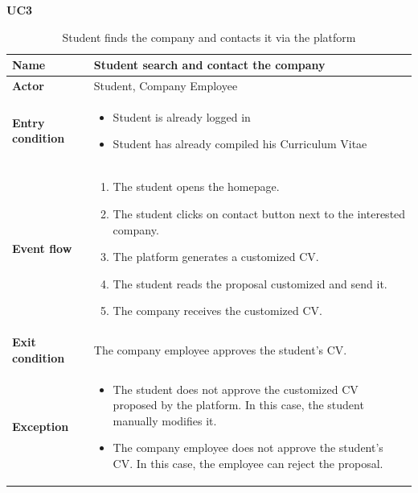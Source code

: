    \textbf{UC3}
    \nopagebreak
    \begin{table}[H]
    \centering
    \begin{tabular}{|l|p{11.9cm}|}
        \hline
        \textbf{Name}            & Student search and contact the company \\\hline
        \textbf{Actor}           & Student, Company Employee         \\\hline
        \textbf{Entry condition} &
        \begin{itemize}
              \item Student is already logged in
              \item Student has already compiled his Curriculum Vitae
        \end{itemize}                                        \\\hline
        \textbf{Event flow}      &
        \begin{enumerate}[label=\arabic*.]
              \item The student opens the homepage.
              \item The student clicks on contact button next to the interested company.
              \item The platform generates a customized CV.
              \item The student reads the proposal customized and send it.
              \item The company receives the customized CV.
        \end{enumerate}            \\\hline
        \textbf{Exit condition}  & The company employee approves the student's CV.\\\hline
        \textbf{Exception}       &  
        \begin{itemize}
              \item The student does not approve the customized CV proposed by the platform. In this case, the student manually modifies it.
              \item The company employee does not approve the student's CV. In this case, the employee can reject the proposal.  
        \end{itemize} 
        \\\hline
    \end{tabular}
    \caption{Student finds the company and contacts it via the platform}
    \label{table:Student search and contact the company}
    \end{table}

